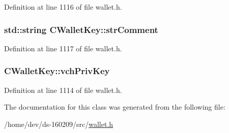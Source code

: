 Definition at line 1116 of file wallet.\+h.

\hypertarget{class_c_wallet_key_aa8804f64837126c6a28c27178eb8c220}{}
\subsubsection[{str\+Comment}]{\setlength{\rightskip}{0pt plus 5cm}std\+::string C\+Wallet\+Key\+::str\+Comment}\label{class_c_wallet_key_aa8804f64837126c6a28c27178eb8c220}


Definition at line 1117 of file wallet.\+h.

\hypertarget{class_c_wallet_key_a28f9bbffcc9d7f2f784d5e4be8ca31f7}{}
\subsubsection[{vch\+Priv\+Key}]{ C\+Wallet\+Key\+::vch\+Priv\+Key}\label{class_c_wallet_key_a28f9bbffcc9d7f2f784d5e4be8ca31f7}


Definition at line 1114 of file wallet.\+h.



The documentation for this class was generated from the following file\+:\begin{DoxyCompactItemize}
\item 
/home/dev/ds-\/160209/src/\hyperlink{wallet_8h}{wallet.\+h}\end{DoxyCompactItemize}
